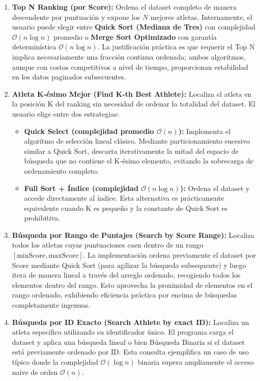 \begin{enumerate}
    \item \textbf{Top N Ranking (por Score):} Ordena el dataset completo de manera descendente por puntuación y expone los $N$ mejores atletas. Internamente, el usuario puede elegir entre \textbf{Quick Sort (Mediana de Tres)} con complejidad $\mathcal{O}(n \log n)$ promedio o \textbf{Merge Sort Optimizado} con garantía determinística $\mathcal{O}(n \log n)$. La justificación práctica es que requerir el Top N implica necesariamente una fracción continua ordenada; ambos algoritmos, aunque con costos competitivos a nivel de tiempo, proporcionan estabilidad en los datos paginados subsecuentes.
    
    \item \textbf{Atleta K-ésimo Mejor (Find K-th Best Athlete):} Localiza el atleta en la posición K del ranking sin necesidad de ordenar la totalidad del dataset. El usuario elige entre dos estrategias:
    \begin{itemize}
        \item \textbf{Quick Select (complejidad promedio $\mathcal{O}(n)$):} Implementa el algoritmo de selección lineal clásico. Mediante particionamiento sucesivo similar a Quick Sort, descarta iterativamente la mitad del espacio de búsqueda que no contiene el K-ésimo elemento, evitando la sobrecarga de ordenamiento completo.
        \item \textbf{Full Sort + Índice (complejidad $\mathcal{O}(n \log n)$):} Ordena el dataset y accede directamente al índice. Esta alternativa es prácticamente equivalente cuando K es pequeño y la constante de Quick Sort es prohibitiva.
    \end{itemize}
    
    \item \textbf{Búsqueda por Rango de Puntajes (Search by Score Range):} Localiza todos los atletas cuyas puntuaciones caen dentro de un rango $[\text{minScore}, \text{maxScore}]$. La implementación ordena previamente el dataset por Score mediante Quick Sort (para agilizar la búsqueda subsequente) y luego itera de manera lineal a través del arreglo ordenado, recogiendo todos los elementos dentro del rango. Esto aprovecha la proximidad de elementos en el rango ordenado, exhibiendo eficiencia práctica por encima de búsquedas completamente ingenuas.
    
    \item \textbf{Búsqueda por ID Exacto (Search Athlete by exact ID):} Localiza un atleta específico utilizando su identificador único. El programa carga el dataset y aplica una búsqueda lineal o bien Búsqueda Binaria si el dataset está previamente ordenado por ID. Esta consulta ejemplifica un caso de uso típico donde la complejidad $\mathcal{O}(\log n)$ binaria supera ampliamente el acceso naive de orden $\mathcal{O}(n)$.
\end{enumerate}

